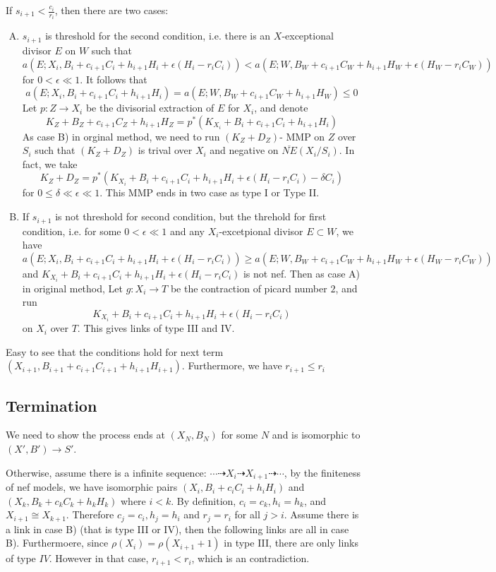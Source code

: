 \documentclass{article}
\begin{document}
If $  s_{i+1}<\frac{c_i}{r_i} $, then there are two cases:
\begin{enumerate}[A)]
\item $ s_{i+1} $ is threshold for the second condition, i.e. there is an $ X $-exceptional divisor $ E $ on $ W $ such that
$$ a(E;X_i,B_i+c_{i+1}C_i+h_{i+1}H_i+\epsilon(H_i-r_iC_i)) < a(E;W,B_W+c_{i+1}C_W+h_{i+1}H_W+\epsilon(H_W-r_iC_W)) $$
for $ 0<\epsilon\ll 1 $.  It follows that
$$ a(E;X_i,B_i+c_{i+1}C_i+h_{i+1}H_i) = a(E;W,B_W+c_{i+1}C_W+h_{i+1}H_W)\leqslant 0 $$
Let $ p:Z\to X_i $ be the divisorial extraction of $ E $ for $ X_i $, and denote
$$ K_Z+B_Z+c_{i+1}C_Z+h_{i+1}H_Z=p^*(K_{X_i}+B_i+c_{i+1}C_i+h_{i+1}H_i) $$
As case B) in orginal method, we need to run $ (K_Z+D_Z) $- MMP on $ Z $ over $ S_i $ such that $  (K_Z+D_Z) $ is trival over $ X_i $ and negative on $ \overline{NE}(X_i/S_i) $.  In fact, we take
$$  K_Z+D_Z=p^*(K_{X_i}+B_i+c_{i+1}C_i+h_{i+1}H_i+\epsilon(H_i-r_iC_i)-\delta C_i) $$
for $ 0\leqslant \delta\ll \epsilon \ll 1 $. This MMP ends in two case as type I or Type II.
\item If $ s_{i+1} $ is not threshold for second condition, but the threhold for first condition, i.e. for some $ 0<\epsilon \ll 1 $ and any $ X_i $-excetpional divisor $ E\subset W $, we have
$$ a(E;X_i,B_i+c_{i+1}C_i+h_{i+1}H_i+\epsilon(H_i-r_iC_i)) \geqslant a(E;W,B_W+c_{i+1}C_W+h_{i+1}H_W+\epsilon(H_W-r_iC_W)) $$
and $ K_{X_i}+B_i+c_{i+1}C_i+h_{i+1}H_i +\epsilon(H_i-r_iC_i)$ is not nef. Then as case A) in original method, Let $ g:X_i\to T $ be the contraction of picard number $ 2 $, and run
$$ K_{X_i}+B_i+c_{i+1}C_i+h_{i+1}H_i +\epsilon(H_i-r_iC_i) $$
on $ X_i $ over $ T $. This gives links of type III and IV.
\end{enumerate}
Easy to see that the conditions hold for next term $ (X_{i+1},B_{i+1}+c_{i+1}C_{i+1}+h_{i+1}H_{i+1}) $. Furthermore, we have $ r_{i+1}\leqslant r_i $
\subsection{Termination}
We need to show the process ends at $ (X_N,B_N) $ for some $ N $ and is isomorphic to $ (X',B')\to S' $.

Otherwise, assume there is a infinite sequence: $\cdots\dashrightarrow X_i\dashrightarrow X_{i+1}\dashrightarrow \cdots $, by the finiteness of nef models, we have isomorphic pairs $  (X_i,B_i+c_iC_i+h_iH_i) $ and $  (X_k,B_k+c_kC_k+h_kH_k) $ where $ i<k $. By definition, $ c_i=c_k,h_i=h_k $, and $ X_{i+1}\cong X_{k+1} $. Therefore $ c_j=c_i , h_j=h_i$ and $ r_j=r_i $ for all $ j>i $. Assume there is a link in case B) (that is type III or IV), then the following links are all in case B). Furthermoere, since $ \rho(X_i)=\rho(X_{i+1}+1) $ in type III, there are only links of type $ IV $. However in that case, $ r_{i+1}< r_i $, which is an contradiction.
\end{document}
